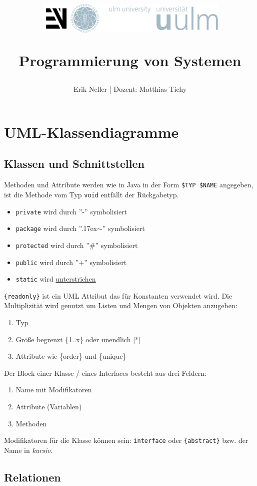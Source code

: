 \documentclass[12pt,a4]{article}
\title{
	\begin{figure}
		\centering
		\includegraphics[height=1.5cm]{logo.png}
	\end{figure}
Programmierung von Systemen 
}
\author{Erik Neller | Dozent: Matthias Tichy}
\begin{document}
	
	\maketitle
	\thispagestyle{empty} %
	\newpage
	
	\tableofcontents
	\newpage
	

	\section{UML-Klassendiagramme}
	\subsection{Klassen und Schnittstellen}
	Methoden und Attribute werden wie in Java in der Form \texttt{\$TYP \$NAME} angegeben, ist die Methode vom Typ \texttt{void} entfällt der Rückgabetyp.
	\begin{itemize}
		\item \texttt{private} wird durch ''-'' symbolisiert
		\item \texttt{package} wird durch ''{\raise.17ex\hbox{$\scriptstyle\sim$}}'' symbolisiert
		\item \texttt{protected} wird durch ''\#'' symbolisiert
		\item \texttt{public} wird durch ''+'' symbolisiert
		\item \texttt{static}  wird \underline{unterstrichen}
	\end{itemize}
	\texttt{\{readonly\}} ist ein UML Attribut das für Konstanten verwendet wird.
	Die Multiplizität wird genutzt um Listen und Mengen von Objekten anzugeben:
	\begin{enumerate}
		\item Typ
		\item Größe begrenzt \{1..x\} oder unendlich [*]
		\item Attribute wie \{order\} und \{unique\}
	\end{enumerate}
	Der Block einer Klasse / eines Interfaces besteht aus drei Feldern: 
	\begin{enumerate}
		\item Name mit Modifikatoren
		\item Attribute (Variablen)
		\item Methoden
	\end{enumerate}
	 Modifikatoren für die Klasse können sein: \texttt{\flqq interface\frqq} oder \texttt{\{abstract\}} bzw. der Name in \textit{kursiv}.

	 \subsection{Relationen}
\end{document}

